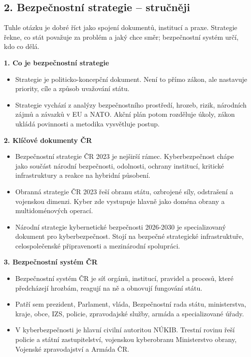 

\subsection*{2. Bezpečnostní strategie -- stručněji}
Tuhle otázku je dobré říct jako spojení dokumentů, institucí a praxe. Strategie řekne, co stát považuje za problém a jaký chce směr; bezpečnostní systém určí, kdo co dělá.

\textbf{1. Co je bezpečnostní strategie}
\begin{itemize}
  \item Strategie je politicko-koncepční dokument. Není to přímo zákon, ale nastavuje priority, cíle a způsob uvažování státu.
  \item Strategie vychází z analýzy bezpečnostního prostředí, hrozeb, rizik, národních zájmů a závazků v EU a NATO. Akční plán potom rozděluje úkoly, zákon ukládá povinnosti a metodika vysvětluje postup.
\end{itemize}

\textbf{2. Klíčové dokumenty ČR}
\begin{itemize}
  \item Bezpečnostní strategie ČR 2023 je nejširší rámec. Kyberbezpečnost chápe jako součást národní bezpečnosti, odolnosti, ochrany institucí, kritické infrastruktury a reakce na hybridní působení.
  \item Obranná strategie ČR 2023 řeší obranu státu, ozbrojené síly, odstrašení a vojenskou dimenzi. Kyber zde vystupuje hlavně jako doména obrany a multidoménových operací.
  \item Národní strategie kybernetické bezpečnosti 2026-2030 je specializovaný dokument pro kyberbezpečnost. Stojí na bezpečné strategické infrastruktuře, celospolečenské připravenosti a mezinárodní spolupráci.
\end{itemize}

\textbf{3. Bezpečnostní systém ČR}
\begin{itemize}
  \item Bezpečnostní systém ČR je síť orgánů, institucí, pravidel a procesů, které předcházejí hrozbám, reagují na ně a obnovují fungování státu.
  \item Patří sem prezident, Parlament, vláda, Bezpečnostní rada státu, ministerstva, kraje, obce, IZS, policie, zpravodajské služby, armáda a specializované úřady.
  \item V kyberbezpečnosti je hlavní civilní autoritou NÚKIB. Trestní rovinu řeší policie a státní zastupitelství, vojenskou kyberobranu Ministerstvo obrany, Vojenské zpravodajství a Armáda ČR.
\end{itemize}


